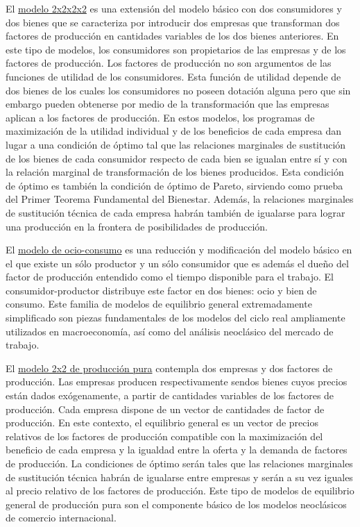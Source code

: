 \documentclass{nuevotema}
\begin{document}
El \underline{modelo 2x2x2x2} es una extensión del modelo básico con dos consumidores y dos bienes que se caracteriza por introducir dos empresas que transforman dos factores de producción en cantidades variables de los dos bienes anteriores. En este tipo de modelos, los consumidores son propietarios de las empresas y de los factores de producción. Los factores de producción no son argumentos de las funciones de utilidad de los consumidores. Esta función de utilidad depende de dos bienes de los cuales los consumidores no poseen dotación alguna pero que sin embargo pueden obtenerse por medio de la transformación que las empresas aplican a los factores de producción. En estos modelos, los programas de maximización de la utilidad individual y de los beneficios de cada empresa dan lugar a una condición de óptimo tal que las relaciones marginales de sustitución de los bienes de cada consumidor respecto de cada bien se igualan entre sí y con la relación marginal de transformación de los bienes producidos. Esta condición de óptimo es también la condición de óptimo de Pareto, sirviendo como prueba del Primer Teorema Fundamental del Bienestar. Además, la relaciones marginales de sustitución técnica de cada empresa habrán también de igualarse para lograr una producción en la frontera de posibilidades de producción. 

El \underline{modelo de ocio-consumo} es una reducción y modificación del modelo básico en el que existe un sólo productor y un sólo consumidor que es además el dueño del factor de producción entendido como el tiempo disponible para el trabajo. El consumidor-productor distribuye este factor en dos bienes: ocio y bien de consumo. Este familia de modelos de equilibrio general extremadamente simplificado son piezas fundamentales de los modelos del ciclo real ampliamente utilizados en macroeconomía, así como del análisis neoclásico del mercado de trabajo.

El \underline{modelo 2x2 de producción pura} contempla dos empresas y dos factores de producción. Las empresas producen respectivamente sendos bienes cuyos precios están dados exógenamente, a partir de cantidades variables de los factores de producción. Cada empresa dispone de un vector de cantidades de factor de producción. En este contexto, el equilibrio general es un vector de precios relativos de los factores de producción compatible con la maximización del beneficio de cada empresa y la igualdad entre la oferta y la demanda de factores de producción. La condiciones de óptimo serán tales que las relaciones marginales de sustitución técnica habrán de igualarse entre empresas y serán a su vez iguales al precio relativo de los factores de producción. Este tipo de modelos de equilibrio general de producción pura son el componente básico de los modelos neoclásicos de comercio internacional. 
\end{document}
